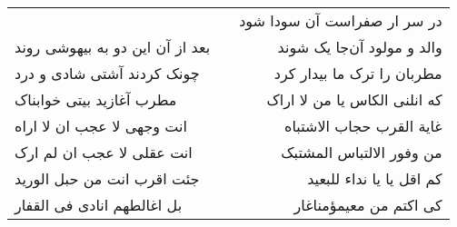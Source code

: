 \begin{center}
\begin{longtable}{l p{0.5cm} r}
&&
در سر ار صفراست آن سودا شود
\\
بعد از آن این دو به بیهوشی روند
&&
والد و مولود آن‌جا یک شوند
\\
چونک کردند آشتی شادی و درد
&&
مطربان را ترک ما بیدار کرد
\\
مطرب آغازید بیتی خوابناک
&&
که انلنی الکاس یا من لا اراک
\\
انت وجهی لا عجب ان لا اراه
&&
غایة القرب حجاب الاشتباه
\\
انت عقلی لا عجب ان لم ارک
&&
من وفور الالتباس المشتبک
\\
جئت اقرب انت من حبل الورید
&&
کم اقل یا یا نداء للبعید
\\
بل اغالطهم انادی فی القفار
&&
کی اکتم من معیمؤمناغار
\\
\end{longtable}
\end{center}

